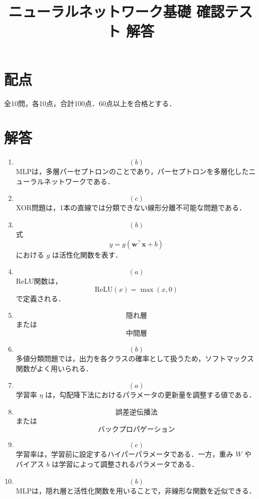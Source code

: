 \documentclass[uplatex,a4paper,12pt]{jsarticle}
\begin{document}
\title{ニューラルネットワーク基礎 確認テスト 解答}
\author{}
\date{}
\maketitle

\section*{配点}
全10問，各10点，合計100点．60点以上を合格とする．

\section*{解答}

\begin{enumerate}

\item
\[
\boxed{(b)}
\]
MLPは，多層パーセプトロンのことであり，パーセプトロンを多層化したニューラルネットワークである．

\item
\[
\boxed{(c)}
\]
XOR問題は，1本の直線では分類できない線形分離不可能な問題である．

\item
\[
\boxed{(b)}
\]
式
\[
y=g(\mathbf{w}^{\top}\mathbf{x}+b)
\]
における $g$ は活性化関数を表す．

\item
\[
\boxed{(a)}
\]
ReLU関数は，
\[
\mathrm{ReLU}(x)=\max(x,0)
\]
で定義される．

\item
\[
\boxed{\text{隠れ層}}
\]
または
\[
\boxed{\text{中間層}}
\]

\item
\[
\boxed{(b)}
\]
多値分類問題では，出力を各クラスの確率として扱うため，ソフトマックス関数がよく用いられる．

\item
\[
\boxed{(a)}
\]
学習率 $\eta$ は，勾配降下法におけるパラメータの更新量を調整する値である．

\item
\[
\boxed{\text{誤差逆伝播法}}
\]
または
\[
\boxed{\text{バックプロパゲーション}}
\]

\item
\[
\boxed{(c)}
\]
学習率は，学習前に設定するハイパーパラメータである．一方，重み $W$ やバイアス $b$ は学習によって調整されるパラメータである．

\item
\[
\boxed{(b)}
\]
MLPは，隠れ層と活性化関数を用いることで，非線形な関数を近似できる．

\end{enumerate}
\end{document}
